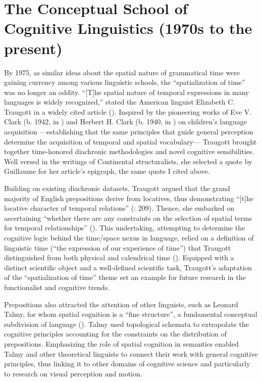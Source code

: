 \documentclass[output=paper]{langsci/langscibook}
\begin{document}
\section{The Conceptual School of Cognitive Linguistics (1970s to the present)}

By 1975, as similar ideas about the spatial nature of grammatical time were gaining currency among various linguistic schools, the “spatialization of time” was no longer an oddity. “[T]he spatial nature of temporal expressions in many languages is widely recognized,” stated the American linguist Elizabeth C. Traugott in a widely cited article (\citeyear[207]{traugott_spatial_1975}). Inspired by the pioneering works of Eve V. Clark (b. 1942, in \citeyear{clark_acquisition_1971}) and Herbert H. Clark (b. 1940, in \citeyear{moore_space_1973}) on children’s language acquisition —establishing that the same principles that guide general perception determine the acquisition of temporal and spatial vocabulary— Traugott brought together time-honored diachronic methodologies and novel cognitive sensibilities. Well versed in the writings of Continental structuralists, she selected a quote by Guillaume for her article’s epigraph, the same quote I cited above.

Building on existing diachronic datasets, Traugott argued that the grand majority of English prepositions derive from locatives, thus demonstrating “[t]he locative character of temporal relations” (\citeyear[209]{traugott_spatial_1975}: 209). Thence, she embarked on ascertaining “whether there are any constraints on the selection of spatial terms for temporal relationships” (\citeyear[207]{traugott_spatial_1975}). This undertaking, attempting to determine the cognitive logic behind the time/space nexus in language, relied on a definition of linguistic time (“the expression of our experience of time”) that Traugott distinguished from both physical and calendrical time (\citeyear[207]{traugott_spatial_1975}). Equipped with a distinct scientific object and a well-defined scientific task, Traugott’s adaptation of the “spatialization of time” theme set an example for future research in the functionalist and cognitive trends. 

Prepositions also attracted the attention of other linguists, such as Leonard Talmy, for whom spatial cognition is a “fine structure”, a fundamental conceptual subdivision of language (\citeyear[225]{pick_how_1983}). Talmy used topological schemata to extrapolate the cognitive principles accounting for the constraints on the distribution of prepositions. Emphasizing the role of spatial cognition in semantics enabled Talmy and other theoretical linguists to connect their work with general cognitive principles, thus linking it to other domains of cognitive science and particularly to research on visual perception and motion. 
\end{document}
